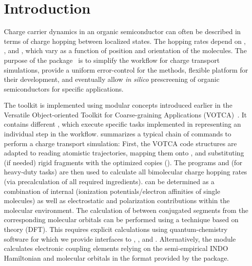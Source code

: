 \chapter{Introduction}
\label{sec:introduction}

Charge carrier dynamics in an organic semiconductor can often be described in terms of charge hopping between localized states. The hopping rates depend on , , and , which vary as a function of position and orientation of the molecules. 
The purpose of the \votcactp package~\cite{ruhle_microscopic_2011} is to simplify the workflow for charge transport simulations, provide a uniform error-control for the methods, flexible platform for their development, and eventually allow {\em in silico} prescreening of organic semiconductors for specific applications. 

The toolkit is implemented using modular concepts introduced earlier in the Versatile Object-oriented Toolkit for Coarse-graining Applications (VOTCA)~\cite{ruhle_versatile_2009}. It contains different , which execute specific tasks implemented in  representing an individual step in the workflow.  summarizes a typical chain of commands to perform a charge transport simulation:   
%
First, the VOTCA code structures are adap\-ted to reading atomistic trajectories, mapping them onto , and substituting (if needed) rigid fragments with the optimized copies (\ctpmap). The programs \ctprun and \ctpparallel (for heavy-duty tasks) are then used to calculate all bimolecular charge hopping rates (via precalculation of all required ingredients).  can be determined as a combination of internal (ionization potentials/electron affinities of single molecules) as well as electrostatic and polarization contributions within the molecular environment. The calculation of  between conjugated segments from the corresponding molecular orbitals can be performed using a  technique based on  theory (DFT). This requires explicit calculations using quantum-chemistry software for which we provide interfaces to \gaussian, \turbomole, and \nwchem. Alternatively, the  module calculates electronic coupling elements relying on the semi-empirical INDO Hamiltonian and molecular orbitals in the format provided by the \gaussian package. 


